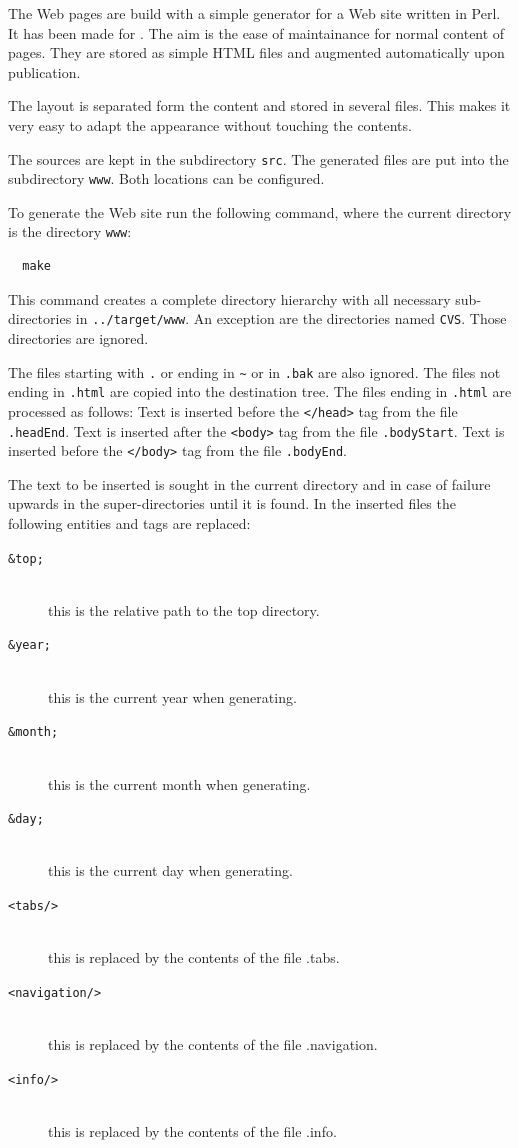\documentclass{extex-doc}
\newcommand\File[1]{\texttt{#1}}
\begin{document}
The Web pages are build with a simple generator for a Web site written
in Perl. It has been made for \ExTeX. The aim is the ease of
maintainance for normal content of pages. They are stored as simple
HTML files and augmented automatically upon publication.

The layout is separated form the content and stored in several files.
This makes it very easy to adapt the appearance without touching the
contents.

The sources are kept in the subdirectory \texttt{src}. The generated
files are put into the subdirectory \texttt{www}. Both locations can
be configured.

To generate the Web site run the following command, where the current
directory is the directory \texttt{www}:

\begin{verbatim}
  make
\end{verbatim}

This command creates a complete directory hierarchy with all necessary
sub-directories in \texttt{../target/www}. An exception are the
directories named \texttt{CVS}. Those directories are ignored.

The files starting with \verb|.| or ending in \verb|~| or in
\texttt{.bak} are also ignored. The files not ending in \verb|.html|
are copied into the destination tree. The files ending in \verb|.html|
are processed as follows: Text is inserted before the \verb|</head>|
tag from the file \File{.headEnd}. Text is inserted after the
\verb|<body>| tag from the file \File{.bodyStart}. Text is inserted
before the \verb|</body>| tag from the file \File{.bodyEnd}.

The text to be inserted is sought in the current directory and in case
of failure upwards in the super-directories until it is found. In the
inserted files the following entities and tags are replaced:

\begin{description}
\item [\tt\&top;]\ \\
  this is the relative path to the top directory.
\item [\tt\&year;]\ \\
  this is the current year when generating.
\item [\tt\&month;]\ \\
  this is the current month when generating.
\item [\tt\&day;]\ \\
  this is the current day when generating.
\item [\tt<tabs/>]\ \\
  this is replaced by the contents of the file .tabs.
\item [\tt<navigation/>]\ \\
  this is replaced by the contents of the file .navigation.
\item [\tt<info/>]\ \\
  this is replaced by the contents of the file .info.
\end{description}
\end{document}
